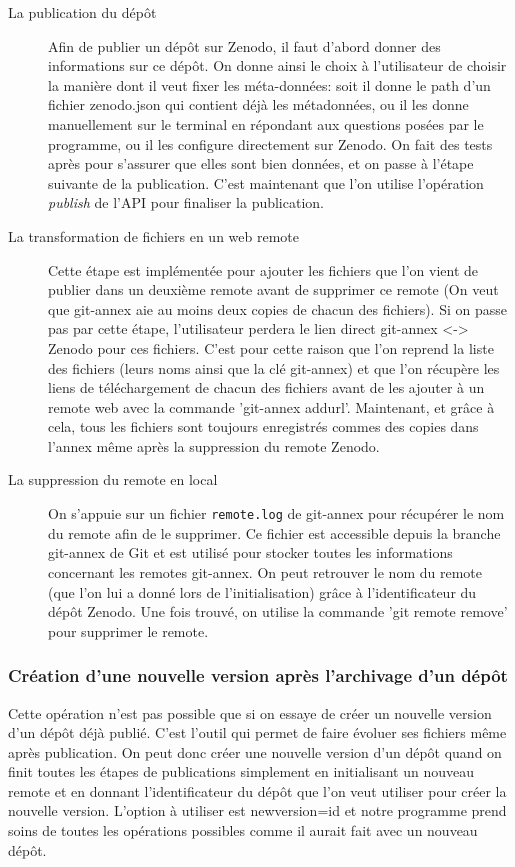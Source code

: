 \documentclass[11pt]{article}
\begin{document}
\begin{description}
\item[{La publication du dépôt}] Afin de publier un dépôt sur Zenodo, il faut d'abord donner des
informations sur ce dépôt. On donne ainsi le choix à l'utilisateur
de choisir la manière dont il veut fixer les méta-données: soit il
donne le path d'un fichier zenodo.json qui contient déjà les
métadonnées, ou il les donne manuellement sur le terminal en
répondant aux questions posées par le programme, ou il les configure
directement sur Zenodo. On fait des tests après pour s'assurer que
elles sont bien données, et on passe à l'étape suivante de la
publication. C'est maintenant que l'on utilise l'opération \emph{publish}
de l'API pour finaliser la publication.

\item[{La transformation de fichiers en un web remote}] Cette étape est implémentée pour ajouter les fichiers que l'on vient
de publier dans un deuxième remote avant de supprimer ce remote (On
veut que git-annex aie au moins deux copies de chacun des
fichiers). Si on passe pas par cette étape, l'utilisateur perdera le
lien direct git-annex <-> Zenodo pour ces fichiers.
C'est pour cette raison que l'on reprend la liste des fichiers
(leurs noms ainsi que la clé git-annex) et que l'on récupère les
liens de téléchargement de chacun des fichiers avant de les ajouter
à un remote web avec la commande 'git-annex addurl'.
Maintenant, et grâce à cela, tous les fichiers sont toujours
enregistrés commes des copies dans l'annex même après la suppression
du remote Zenodo.

\item[{La suppression du remote en local}] On s'appuie sur un fichier \texttt{remote.log} de git-annex pour récupérer le
nom du remote afin de le supprimer. Ce fichier est accessible depuis
la branche git-annex de Git et est utilisé pour stocker toutes les
informations concernant les remotes git-annex.
On peut retrouver le nom du remote (que l'on lui a donné lors de
l'initialisation) grâce à l'identificateur du dépôt Zenodo. Une fois
trouvé, on utilise la commande 'git remote remove' pour supprimer le
remote.
\end{description}

\subsubsection{Création d'une nouvelle version après l'archivage d'un dépôt}
\label{sec:orgad09336}
Cette opération n'est pas possible que si on essaye de créer un
nouvelle version d'un dépôt déjà publié. C'est l'outil qui permet de
faire évoluer ses fichiers même après publication.
On peut donc créer une nouvelle version d'un dépôt quand on finit
toutes les étapes de publications simplement en initialisant un
nouveau remote et en donnant l'identificateur du dépôt que l'on veut
utiliser pour créer la nouvelle version.
L'option à utiliser est newversion=id et notre programme prend soins
de toutes les opérations possibles comme il aurait fait avec un
nouveau dépôt. 
\end{document}
